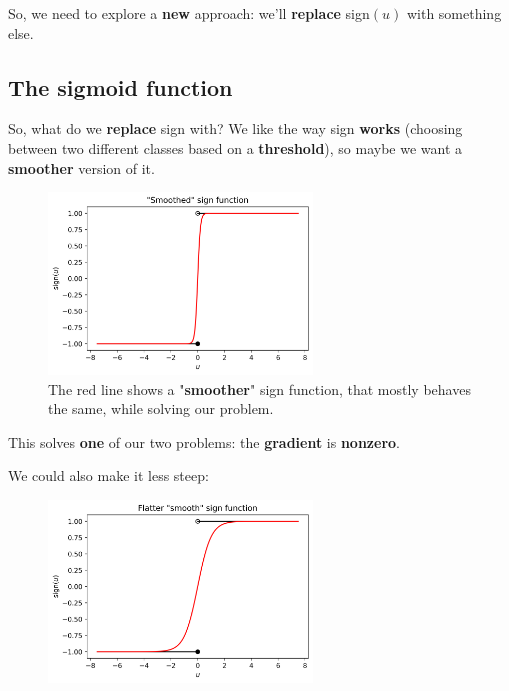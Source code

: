         So, we need to explore a \textbf{new} approach: we'll \textbf{replace} sign$(u)$ with something else.
    
    \subsection*{The sigmoid function}
    
        So, what do we \textbf{replace} sign with? We like the way sign \textbf{works} (choosing between two different classes based on a \textbf{threshold}), so maybe we want a \textbf{smoother} version of it.
        
        \begin{figure}[H]
            \centering
            
            \includegraphics[width=70mm,scale=0.5]{images/classification_images/smoothed_sign_function.png}
            \caption*{The red line shows a "\textbf{smoother}" sign function, that mostly behaves the same, while solving our problem.}
        \end{figure}
        
        This solves \textbf{one} of our two problems: the \textbf{gradient} is \textbf{nonzero}. 
        
        We could also make it less steep:
        
        \begin{figure}[H]
            \centering
            
            \includegraphics[width=70mm,scale=0.5]{images/classification_images/flatter_smooth_sign_function.png}
        \end{figure}
        
